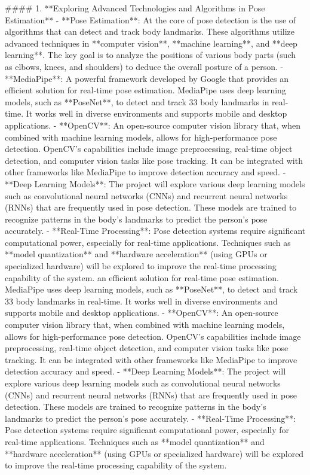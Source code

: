 \documentclass[a4paper,12pt]{report}
\begin{document}
#### 1. **Exploring Advanced Technologies and Algorithms in Pose Estimation**
   - **Pose Estimation**: At the core of pose detection is the use of algorithms that can detect and track body landmarks. These algorithms utilize advanced techniques in **computer vision**, **machine learning**, and **deep learning**. The key goal is to analyze the positions of various body parts (such as elbows, knees, and shoulders) to deduce the overall posture of a person.
     - **MediaPipe**: A powerful framework developed by Google that provides an efficient solution for real-time pose estimation. MediaPipe uses deep learning models, such as **PoseNet**, to detect and track 33 body landmarks in real-time. It works well in diverse environments and supports mobile and desktop applications.
     - **OpenCV**: An open-source computer vision library that, when combined with machine learning models, allows for high-performance pose detection. OpenCV’s capabilities include image preprocessing, real-time object detection, and computer vision tasks like pose tracking. It can be integrated with other frameworks like MediaPipe to improve detection accuracy and speed.
   - **Deep Learning Models**: The project will explore various deep learning models such as convolutional neural networks (CNNs) and recurrent neural networks (RNNs) that are frequently used in pose detection. These models are trained to recognize patterns in the body’s landmarks to predict the person’s pose accurately.
   - **Real-Time Processing**: Pose detection systems require significant computational power, especially for real-time applications. Techniques such as **model quantization** and **hardware acceleration** (using GPUs or specialized hardware) will be explored to improve the real-time processing capability of the system.
an efficient solution for real-time pose estimation. MediaPipe uses deep learning models, such as **PoseNet**, to detect and track 33 body landmarks in real-time. It works well in diverse environments and supports mobile and desktop applications.
     - **OpenCV**: An open-source computer vision library that, when combined with machine learning models, allows for high-performance pose detection. OpenCV’s capabilities include image preprocessing, real-time object detection, and computer vision tasks like pose tracking. It can be integrated with other frameworks like MediaPipe to improve detection accuracy and speed.
   - **Deep Learning Models**: The project will explore various deep learning models such as convolutional neural networks (CNNs) and recurrent neural networks (RNNs) that are frequently used in pose detection. These models are trained to recognize patterns in the body’s landmarks to predict the person’s pose accurately.
   - **Real-Time Processing**: Pose detection systems require significant computational power, especially for real-time applications. Techniques such as **model quantization** and **hardware acceleration** (using GPUs or specialized hardware) will be explored to improve the real-time processing capability of the system.
\end{document}
